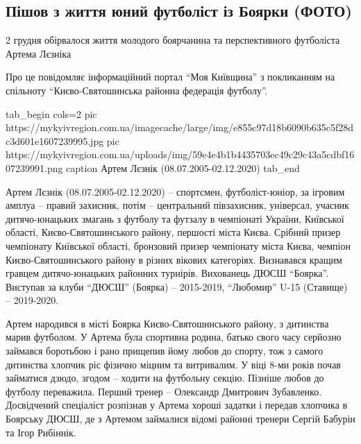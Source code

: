  
 
 
 
 
 
\subsection{Пішов з життя юний футболіст із Боярки (ФОТО)}
\label{sec:06_12_2020.news.ua.mykyivregion.1.bojarka_junyy_futbolist}

2 грудня обірвалося життя молодого боярчанина та перспективного футболіста Артема Лєзніка

Про це повідомляє інформаційний портал \enquote{Моя Київщина} з покликанням на
спільноту \enquote{Києво-Святошинська районна федерація футболу}.

\ifcmt
tab_begin cols=2
pic https://mykyivregion.com.ua/imagecache/large/img/e855c97d18b6090b635c5f28dc3d601e1607239995.jpg
pic https://mykyivregion.com.ua/uploads/img/59e4e4b1b4435703ec49c29c43a5cdbf1607239991.png
caption Артем Лєзнік (08.07.2005-02.12.2020)
tab_end
\fi

Артем Лєзнік (08.07.2005-02.12.2020) – спортсмен, футболіст-юніор, за ігровим
амплуа – правий захисник, потім – центральний півзахисник, універсал, учасник
дитячо-юнацьких  змагань з футболу та футзалу в чемпіонаті України, Київської
області, Києво-Святошинського району, першості міста Києва. Срібний призер
чемпіонату Київської області, бронзовий призер чемпіонату міста Києва, чемпіон
Києво-Святошинського району в різних вікових категоріях. Визнавався кращим
гравцем дитячо-юнацьких районних турнірів. Вихованець ДЮСШ \enquote{Боярка}. Виступав
за клуби \enquote{ДЮСШ} (Боярка) – 2015-2019, \enquote{Любомир} U-15 (Ставище) – 2019-2020.

Артем народився в місті Боярка Києво-Святошинського району, з дитинства  марив
футболом. У Артема була спортивна родина, батько свого часу серйозно займався
боротьбою і рано прищепив йому любов до спорту, тож з самого дитинства хлопчик
ріс фізично міцним та витривалим. У віці 8-ми років почав займатися дзюдо,
згодом – ходити на футбольну секцію. Пізніше любов до футболу переважила.
Перший тренер – Олександр Дмитрович Зубавленко. Досвідчений спеціаліст
розпізнав у Артема хороші задатки і передав хлопчика в Боярську ДЮСШ, де з
Артемом займалися відомі районні тренери Сергій Бабурін та Ігор Рибіннік.

